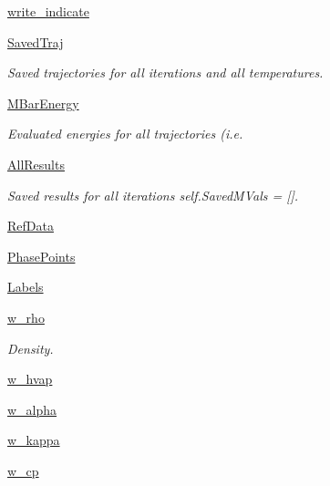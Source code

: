 \begin{DoxyCompactItemize}
\hyperlink{classforcebalance_1_1liquid_1_1Liquid_a2ef5b56bb5efbc942535ee406d514610}{write\-\_\-indicate}
\item 
\hyperlink{classforcebalance_1_1liquid_1_1Liquid_a0da0c00cdc193c9c470d7e528043fb99}{Saved\-Traj}
\begin{DoxyCompactList}\small\item\em Saved trajectories for all iterations and all temperatures. \end{DoxyCompactList}\item 
\hyperlink{classforcebalance_1_1liquid_1_1Liquid_a6c00a87ae43f535118b77d41af51a5d7}{M\-Bar\-Energy}
\begin{DoxyCompactList}\small\item\em Evaluated energies for all trajectories (i.\-e. \end{DoxyCompactList}\item 
\hyperlink{classforcebalance_1_1liquid_1_1Liquid_a2a6b03a459dc55596920124abd0f7d13}{All\-Results}
\begin{DoxyCompactList}\small\item\em Saved results for all iterations self.\-Saved\-M\-Vals = \mbox{[}\mbox{]}. \end{DoxyCompactList}\item 
\hyperlink{classforcebalance_1_1liquid_1_1Liquid_a472f32bbaf18b8ead19b9156f305b8fc}{Ref\-Data}
\item 
\hyperlink{classforcebalance_1_1liquid_1_1Liquid_a2c10490d9073a069bd19361f386422ef}{Phase\-Points}
\item 
\hyperlink{classforcebalance_1_1liquid_1_1Liquid_a50f976d2d3d6a1c261756035a26390e2}{Labels}
\item 
\hyperlink{classforcebalance_1_1liquid_1_1Liquid_aef8ad1dda086bde6f48130d273af9784}{w\-\_\-rho}
\begin{DoxyCompactList}\small\item\em Density. \end{DoxyCompactList}\item 
\hyperlink{classforcebalance_1_1liquid_1_1Liquid_abe985fe3aaa03d9f3a1b0a90f26b774d}{w\-\_\-hvap}
\item 
\hyperlink{classforcebalance_1_1liquid_1_1Liquid_a0d36d27d8c406b53bbb1096fbb76adbb}{w\-\_\-alpha}
\item 
\hyperlink{classforcebalance_1_1liquid_1_1Liquid_a6b262d9343247a902063bf62d5f19108}{w\-\_\-kappa}
\item 
\hyperlink{classforcebalance_1_1liquid_1_1Liquid_a3809c649d95ac6c9f662d599e6b1b93d}{w\-\_\-cp}
\item 

\end{DoxyCompactItemize}
